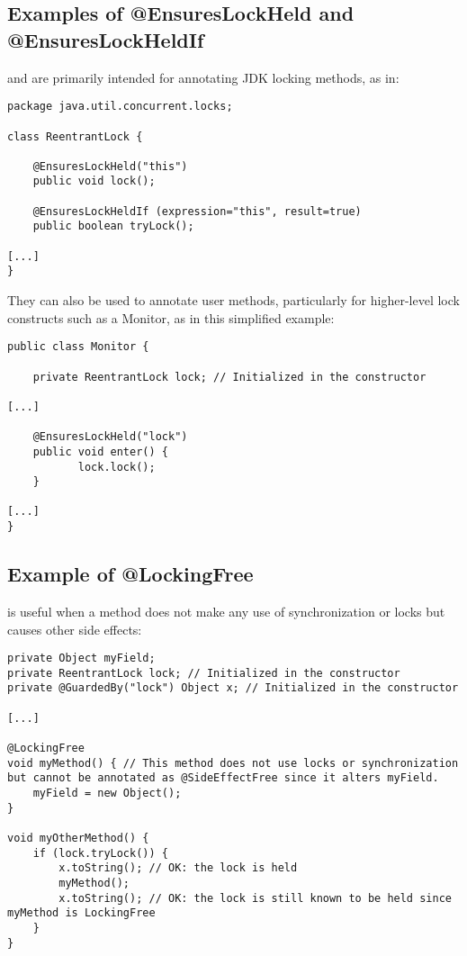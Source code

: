 \subsection{Examples of @EnsuresLockHeld and @EnsuresLockHeldIf\label{ensureslockheld-examples}}

 and  are primarily intended
for annotating JDK locking methods, as in:

\begin{Verbatim}
package java.util.concurrent.locks;
 
class ReentrantLock {
 
    @EnsuresLockHeld("this")
    public void lock();
 
    @EnsuresLockHeldIf (expression="this", result=true)
    public boolean tryLock();
 
[...]
}
\end{Verbatim}

They can also be used to annotate user methods, particularly for
higher-level lock constructs such as a Monitor, as in this simplified example:

\begin{Verbatim}
public class Monitor {
 
    private ReentrantLock lock; // Initialized in the constructor
 
[...]
 
    @EnsuresLockHeld("lock")
    public void enter() {
           lock.lock();
    }
 
[...]
}
\end{Verbatim}

\subsection{Example of @LockingFree}

 is useful when a method does not make any use of synchronization
or locks but causes other side effects:

\begin{verbatim}
private Object myField;
private ReentrantLock lock; // Initialized in the constructor
private @GuardedBy("lock") Object x; // Initialized in the constructor
 
[...]
 
@LockingFree
void myMethod() { // This method does not use locks or synchronization but cannot be annotated as @SideEffectFree since it alters myField.
    myField = new Object();
}
 
void myOtherMethod() {
    if (lock.tryLock()) {
        x.toString(); // OK: the lock is held
        myMethod();
        x.toString(); // OK: the lock is still known to be held since myMethod is LockingFree
    }
}
\end{verbatim}

